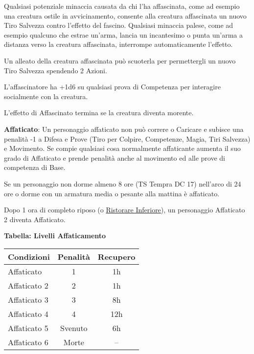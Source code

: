 \begin{multicols}{2}
Qualsiasi potenziale minaccia causata da chi l'ha affascinata, come ad esempio una creatura ostile in avvicinamento, consente alla creatura affascinata un nuovo Tiro Salvezza contro l'effetto del fascino. Qualsiasi minaccia palese, come ad esempio qualcuno che estrae un'arma, lancia un incantesimo o punta un'arma a distanza verso la creatura affascinata, interrompe automaticamente l'effetto.

Un alleato della creatura affascinata può scuoterla per permettergli un nuovo Tiro Salvezza spendendo 2 Azioni.

L'affascinatore ha +1d6 su qualsiasi prova di Competenza per interagire socialmente con la creatura.

L'effetto di Affascinato termina se la creatura diventa morente.

\textbf{Affaticato}\hypertarget{affaticato}{}\label{affaticato}: Un personaggio affaticato non può correre o Caricare e subisce una penalità -1 a Difesa e Prove (Tiro per Colpire, Competenze, Magia, Tiri Salvezza) e Movimento. Se compie qualsiasi cosa normalmente affaticante aumenta il suo grado di Affaticato e prende penalità anche al movimento ed alle prove di competenza di Base.

Se un personaggio non dorme almeno 8 ore (TS Tempra DC 17) nell'arco di 24 ore o dorme con un armatura media o pesante alla mattina è affaticato.

Dopo 1 ora di completo riposo (o \hyperlink{Ristorare Inferiore}{Ristorare Inferiore}), un personaggio Affaticato 2 diventa Affaticato.

\medskip

\textbf{Tabella: Livelli Affaticamento}

\medskip

\noindent\begin{tabularx}{\linewidth}{Xcc}
	\toprule
\rowcolor{gray!20}\textbf{Condizioni}& \textbf{Penalità}&\textbf{Recupero}\\
\toprule
Affaticato 		&	1 		&	1h\\
\rowcolor{gray!20}Affaticato 2	&	2		&	1h\\
Affaticato 3	&	3		&	8h\\
\rowcolor{gray!20}Affaticato 4	&	4		&	12h\\
Affaticato 5	&	Svenuto	&	6h\\
\rowcolor{gray!20}Affaticato 6	&	Morte	&	--
\end{tabularx}


\end{multicols}
